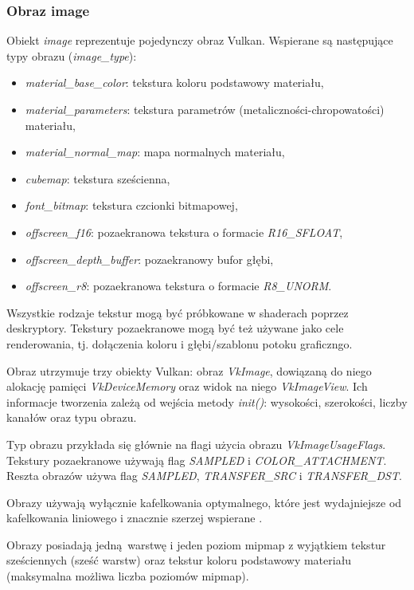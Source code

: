 \subsubsection{Obraz image}
Obiekt \textit{image} reprezentuje pojedynczy obraz Vulkan.
Wspierane są następujące typy obrazu (\textit{image\_type}):
\begin{itemize}
	\item \textit{material\_base\_color}: tekstura koloru podstawowy materiału,
	\item \textit{material\_parameters}: tekstura parametrów (metaliczności-chropowatości) materiału,
	\item \textit{material\_normal\_map}: mapa normalnych materiału,
	\item \textit{cubemap}: tekstura sześcienna,
	\item \textit{font\_bitmap}: tekstura czcionki bitmapowej,
	\item \textit{offscreen\_f16}: pozaekranowa tekstura o formacie \textit{R16\_SFLOAT},
	\item \textit{offscreen\_depth\_buffer}: pozaekranowy bufor głębi,
	\item \textit{offscreen\_r8}: pozaekranowa tekstura o formacie \textit{R8\_UNORM}.
\end{itemize}

Wszystkie rodzaje tekstur mogą być próbkowane w shaderach poprzez deskryptory.
Tekstury pozaekranowe mogą być też używane jako cele renderowania, tj. dołączenia koloru i głębi/szablonu potoku graficzngo.

Obraz utrzymuje trzy obiekty Vulkan: obraz \textit{VkImage}, dowiązaną do niego alokację pamięci \textit{VkDeviceMemory} oraz widok na niego \textit{VkImageView}.
Ich informacje tworzenia zależą od wejścia metody \textit{init()}: wysokości, szerokości, liczby kanałów oraz typu obrazu.

Typ obrazu przykłada się głównie na flagi użycia obrazu \textit{VkImageUsageFlags}.
Tekstury pozaekranowe używają flag \textit{SAMPLED} i \textit{COLOR\_ATTACHMENT}.
Reszta obrazów używa flag \textit{SAMPLED}, \textit{TRANSFER\_SRC} i \textit{TRANSFER\_DST}.

Obrazy używają wyłącznie kafelkowania optymalnego, które jest wydajniejsze od kafelkowania liniowego i znacznie szerzej wspierane \cite{GPUINFO}.

Obrazy posiadają jedną warstwę i jeden poziom mipmap z wyjątkiem tekstur sześciennych (sześć warstw) oraz tekstur koloru podstawowy materiału (maksymalna możliwa liczba poziomów mipmap).

